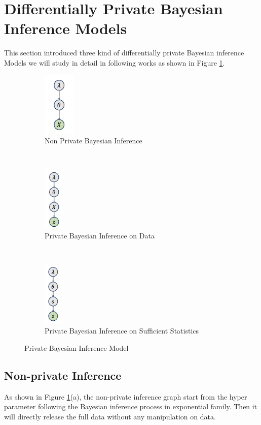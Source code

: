 \documentclass{article}
\begin{document}
\section{Differentially Private Bayesian Inference Models}
%
This section introduced three kind of differentially private Bayesian inference Models we will study in detail in following works as shown in Figure \ref{fig_pinfermodel}. 
\begin{figure}[t!]
    \centering
    \begin{subfigure}[t]{0.3\textwidth}
        \centering
        \includegraphics[height=1.2in]{nonp.png}
        \caption{Non Private Bayesian Inference}
    \end{subfigure}%
    ~ 
    \begin{subfigure}[t]{0.3\textwidth}
        \centering
        \includegraphics[height=1.2in]{pinfer}
        \caption{Private Bayesian Inference on Data}
    \end{subfigure}
    ~ 
    \begin{subfigure}[t]{0.3\textwidth}
        \centering
        \includegraphics[height=1.2in]{pinferons}
        \caption{Private Bayesian Inference on Sufficient Statistics}
    \end{subfigure}
    \caption{Private Bayesian Inference Model}
    \label{fig_pinfermodel}
\end{figure}
\subsection{Non-private Inference}
%
As shown in Figure \ref{fig_pinfermodel}(a), the non-private inference graph start from the hyper parameter following the Bayesian inference process in exponential family.
%
Then it will directly release the full data without any manipulation on data.
\end{document}
